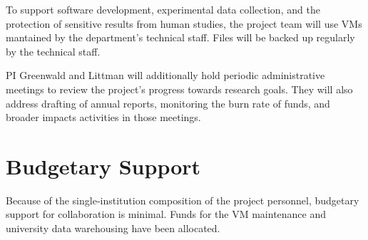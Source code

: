 \documentclass[11pt,letterpaper]{article}
\begin{document}
To support software development, experimental data collection, and the
protection of sensitive results from human studies, the project team
will use VMs mantained by the department's technical staff.  Files
will be backed up regularly by the technical staff.

PI Greenwald and Littman will additionally hold periodic
administrative meetings to review the project's progress towards
research goals. They will also address drafting of annual reports,
monitoring the burn rate of funds, and broader impacts activities in
those meetings.

\section*{Budgetary Support}

Because of the single-institution composition of the project
personnel, budgetary support for collaboration is minimal. Funds for
the VM maintenance and university data warehousing have been
allocated. 

\end{document}
